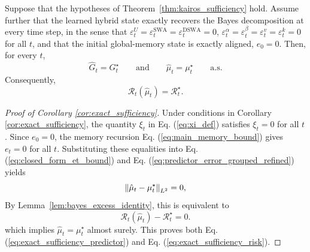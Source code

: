 





















\begin{corollary}
\label{cor:exact_sufficiency}
Suppose that the hypotheses of Theorem~\ref{thm:kairos_sufficiency} hold. Assume further that the learned hybrid state exactly recovers the Bayes decomposition at every time step, in the sense that $\varepsilon_t^U
=
\varepsilon_t^{\mathrm{SWA}}
=
\varepsilon_t^{\mathrm{DSWA}}
=
0$, $\varepsilon_t^\alpha
=
\varepsilon_t^\beta
=
\varepsilon_t^v
=
\varepsilon_t^k
=
0$
for all  $t$, and that the initial global-memory state is exactly aligned, $e_0 = 0$.
Then, for every $t$,
\begin{equation}
\hat G_t = G_t^\star
\qquad\text{and}\qquad
\hat\mu_t = \mu_t^\star
\qquad \text{a.s.}
\label{eq:exact_sufficiency_predictor}
\end{equation}
Consequently,
\begin{equation}
\mathcal R_t(\hat\mu_t)=\mathcal R_t^\star.
\label{eq:exact_sufficiency_risk}
\end{equation}
\end{corollary}







\begin{proof}[Proof of Corollary \ref{cor:exact_sufficiency}]
Under conditions in  Corollary \ref{cor:exact_sufficiency}, the quantity $\xi_t$ in Eq. (\ref{eq:xi_def}) satisfies $\xi_t = 0$ for all $t$. Since $e_0=0$, the memory recursion Eq. (\ref{eq:main_memory_bound}) gives $e_t=0$ for all $t$. Substituting these equalities into Eq. (\ref{eq:closed_form_et_bound}) and Eq. (\ref{eq:predictor_error_grouped_refined}) yields
\[
\left\lVert \hat\mu_t-\mu_t^\star \right\rVert_{L^2} = 0,
\]
By Lemma~\ref{lem:bayes_excess_identity}, this is equivalent to
\[
\mathcal R_t(\hat\mu_t)-\mathcal R_t^\star = 0.
\]
which implies $\hat\mu_t=\mu_t^\star$ almost surely. This proves both Eq. (\ref{eq:exact_sufficiency_predictor}) and Eq. (\ref{eq:exact_sufficiency_risk}).
\end{proof}


